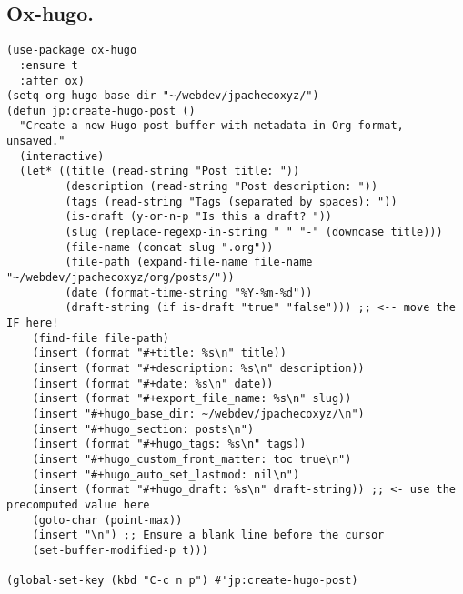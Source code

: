 \documentclass[11pt]{article}
\begin{document}
\subsection{Ox-hugo.}
\label{sec:org93d5dc8}
\begin{verbatim}
(use-package ox-hugo
  :ensure t
  :after ox)
(setq org-hugo-base-dir "~/webdev/jpachecoxyz/")
(defun jp:create-hugo-post ()
  "Create a new Hugo post buffer with metadata in Org format, unsaved."
  (interactive)
  (let* ((title (read-string "Post title: "))
         (description (read-string "Post description: "))
         (tags (read-string "Tags (separated by spaces): "))
         (is-draft (y-or-n-p "Is this a draft? "))
         (slug (replace-regexp-in-string " " "-" (downcase title)))
         (file-name (concat slug ".org"))
         (file-path (expand-file-name file-name "~/webdev/jpachecoxyz/org/posts/"))
         (date (format-time-string "%Y-%m-%d"))
         (draft-string (if is-draft "true" "false"))) ;; <-- move the IF here!
    (find-file file-path)
    (insert (format "#+title: %s\n" title))
    (insert (format "#+description: %s\n" description))
    (insert (format "#+date: %s\n" date))
    (insert (format "#+export_file_name: %s\n" slug))
    (insert "#+hugo_base_dir: ~/webdev/jpachecoxyz/\n")
    (insert "#+hugo_section: posts\n")
    (insert (format "#+hugo_tags: %s\n" tags))
    (insert "#+hugo_custom_front_matter: toc true\n")
    (insert "#+hugo_auto_set_lastmod: nil\n")
    (insert (format "#+hugo_draft: %s\n" draft-string)) ;; <- use the precomputed value here
    (goto-char (point-max))
    (insert "\n") ;; Ensure a blank line before the cursor
    (set-buffer-modified-p t)))

(global-set-key (kbd "C-c n p") #'jp:create-hugo-post)
\end{verbatim}
\end{document}
